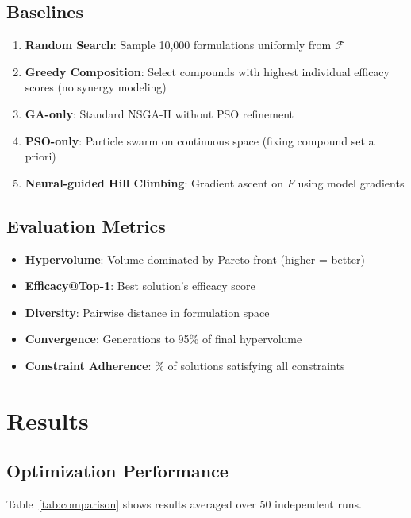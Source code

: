 \documentclass[11pt,a4paper]{article}
\begin{document}
\subsection{Baselines}

\begin{enumerate}
    \item \textbf{Random Search}: Sample 10,000 formulations uniformly from $\mathcal{F}$
    \item \textbf{Greedy Composition}: Select compounds with highest individual efficacy scores (no synergy modeling)
    \item \textbf{GA-only}: Standard NSGA-II without PSO refinement
    \item \textbf{PSO-only}: Particle swarm on continuous space (fixing compound set a priori)
    \item \textbf{Neural-guided Hill Climbing}: Gradient ascent on $F$ using model gradients
\end{enumerate}

\subsection{Evaluation Metrics}

\begin{itemize}
    \item \textbf{Hypervolume}: Volume dominated by Pareto front (higher = better)
    \item \textbf{Efficacy@Top-1}: Best solution's efficacy score
    \item \textbf{Diversity}: Pairwise distance in formulation space
    \item \textbf{Convergence}: Generations to 95\% of final hypervolume
    \item \textbf{Constraint Adherence}: \% of solutions satisfying all constraints
\end{itemize}

\section{Results}

\subsection{Optimization Performance}

Table~\ref{tab:comparison} shows results averaged over 50 independent runs.
\end{document}
